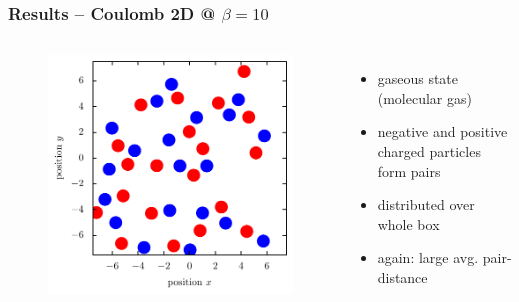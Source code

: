 \documentclass[mathserif,serif]{beamer}
\begin{document}
\begin{frame}
	\frametitle{Results -- Coulomb 2D @ $\beta=10$}
	\centering
	\begin{columns}	
	\begin{figure}
	\includegraphics[width=\textwidth]{../report/figures/Gas_1_beta_10.pdf}
	\end{figure}
	\begin{itemize}
	\setlength{\itemsep}{1.3em}
	\item gaseous state (molecular gas)
	\item negative and positive charged particles form pairs
	\item distributed over whole box
	\item again: large avg. pair-distance
	\end{itemize}
\end{columns}
\end{frame}
\end{document}
